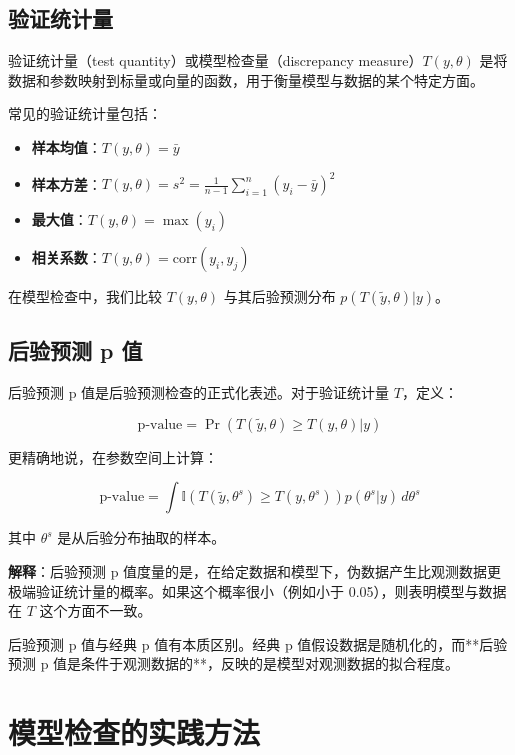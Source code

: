 \subsection{验证统计量}

验证统计量（test quantity）或模型检查量（discrepancy measure）$T(y, \theta)$ 是将数据和参数映射到标量或向量的函数，用于衡量模型与数据的某个特定方面。

常见的验证统计量包括：

\begin{itemize}
  \item \textbf{样本均值}：$T(y, \theta) = \bar{y}$
  \item \textbf{样本方差}：$T(y, \theta) = s^2 = \frac{1}{n-1}\sum_{i=1}^n (y_i - \bar{y})^2$
  \item \textbf{最大值}：$T(y, \theta) = \max(y_i)$
  \item \textbf{相关系数}：$T(y, \theta) = \text{corr}(y_i, y_j)$
\end{itemize}

在模型检查中，我们比较 $T(y, \theta)$ 与其后验预测分布 $p(T(\tilde{y}, \theta) | y)$。

\subsection{后验预测 p 值}

后验预测 p 值是后验预测检查的正式化表述。对于验证统计量 $T$，定义：

\[
\text{p-value} = \Pr(T(\tilde{y}, \theta) \geq T(y, \theta) | y)
\]

更精确地说，在参数空间上计算：

\[
\text{p-value} = \int \mathbb{I}(T(\tilde{y}, \theta^s) \geq T(y, \theta^s)) p(\theta^s | y) \, d\theta^s
\]

其中 $\theta^s$ 是从后验分布抽取的样本。

\textbf{解释}：后验预测 p 值度量的是，在给定数据和模型下，伪数据产生比观测数据更极端验证统计量的概率。如果这个概率很小（例如小于 0.05），则表明模型与数据在 $T$ 这个方面不一致。

\begin{Remark}
  后验预测 p 值与经典 p 值有本质区别。经典 p 值假设数据是随机化的，而**后验预测 p 值是条件于观测数据的**，反映的是模型对观测数据的拟合程度。
\end{Remark}

\section{模型检查的实践方法}

